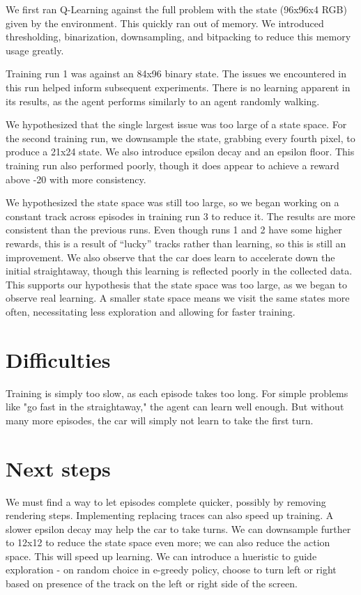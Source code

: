 \documentclass{article}
\begin{document}
We first ran Q-Learning against the full problem with the state (96x96x4
RGB) given by the environment. This quickly ran out of memory. We
introduced thresholding, binarization, downsampling, and bitpacking to
reduce this memory usage greatly.

Training run 1 was against an 84x96 binary state. The issues we
encountered in this run helped inform subsequent experiments. There is
no learning apparent in its results, as the agent performs similarly to
an agent randomly walking.

We hypothesized that the single largest issue was too large of a state
space. For the second training run, we downsample the state, grabbing
every fourth pixel, to produce a 21x24 state. We also introduce epsilon
decay and an epsilon floor. This training run also performed poorly,
though it does appear to achieve a reward above -20 with more
consistency.

We hypothesized the state space was still too large, so we began working
on a constant track across episodes in training run 3 to reduce it. The
results are more consistent than the previous runs. Even though runs 1
and 2 have some higher rewards, this is a result of ``lucky'' tracks
rather than learning, so this is still an improvement. We also observe
that the car does learn to accelerate down the initial straightaway,
though this learning is reflected poorly in the collected data. This
supports our hypothesis that the state space was too large, as we began
to observe real learning.
A smaller state space means we visit the same states more often, necessitating less exploration and allowing for faster training.

\section{Difficulties}

Training is simply too slow, as each episode takes too long.
For simple problems like "go fast in the straightaway," the agent can learn well enough.
But without many more episodes, the car will simply not learn to take the first turn.

\section{Next steps}

We must find a way to let episodes complete quicker, possibly by removing rendering steps. 
Implementing replacing traces can also speed up training. 
A slower epsilon decay may help the car to take turns.
We can downsample further to 12x12 to reduce the state space even more; we can also reduce the action space.
This will speed up learning.
We can introduce a hueristic to guide exploration - on random choice in e-greedy policy, choose to turn left or right based on presence of the track on the left or right side of the screen.
\end{document}
